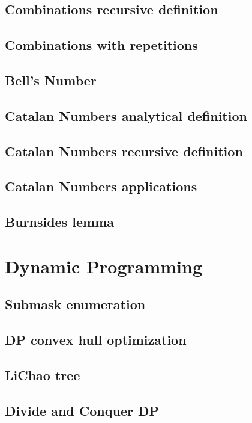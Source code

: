 \subsection{Combinations recursive definition}
\subsection{Combinations with repetitions}
\subsection{Bell’s Number}
\subsection{Catalan Numbers analytical definition}
\subsection{Catalan Numbers recursive definition}
\subsection{Catalan Numbers applications}
\subsection{Burnsides lemma}


\section{Dynamic Programming}
\subsection{Submask enumeration}
\subsection{DP convex hull optimization}
\subsection{LiChao tree}
\subsection{Divide and Conquer DP}

